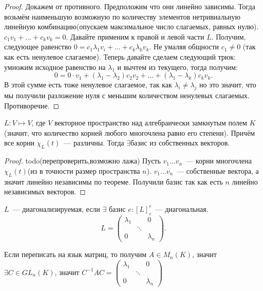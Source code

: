 \begin{proof}
    Докажем от противного. Предположим что они линейно зависимы. Тогда возьмём наименьшую возможную по количеству элементов
    нетривиальную линейную комбинацию(опускаем максимальное число слагаемых, равных нулю).
    $c_1v_1+\dots+c_kv_k = 0$. Давайте применим к правой и левой части $L$. Получим, следующее равенство
    $0 = c_1\lambda_1v_i+\dots + c_k\lambda_kv_k$. Не умаляя общности $c_1\not=0$ (так как есть ненулевое слагаемое).
    Теперь давайте сделаем следующий трюк: умножим исходное равенство на $\lambda_1$ и вычтем из текущего, тогда получим:
    \[
    0 = 0\cdot v_1 + (\lambda_1 - \lambda_2)c_2v_2 + \dots + (\lambda_1 - \lambda_k) c_k v_k
    .\]
    В этой сумме есть тоже ненулевое слагаемое, так как $\lambda_i \not= \lambda_j$ но это значит, что мы получили
    разложение нуля с меньшим количеством ненулевых слагаемых. Противоречие.
\end{proof}
\begin{follow}
    $L\colon V \mapsto V$, где $V$ векторное пространство над алгебраически замкнутым полем $K$(значит, что количество корней
    любого многочлена равно его степени). Причём все корни $\chi_L(t)$~--- различны.
    Тогда $\exists \text{базис из собственных векторов}$.
\end{follow}
\begin{proof}
    todo(перепроверить,возможно лажа)
    Пусть $v_1\dots v_n$~--- корни многочлена $\chi_L(t)$(из в точности размер пространства $n$).
    $v_1\dots v_n$~--- собственные вектора, а значит линейно независимы по теореме. Получили базис так как есть
    $n$ линейно независимых векторов.
\end{proof}
\begin{definition}
    $L$~--- диагонализируемая, если $\exists$ базис $e\colon [L]^e_e$~--- диагональная.
    \[
        L = 
        \begin{pmatrix}
            \lambda_1&&0\\
            &\ddots &\\
            0& & \lambda_n
        \end{pmatrix}
    .\] 

    Если переписать на язык матриц, то получим $A\in M_n(K)$, значит $\exists C\in GL_n(K)$, значит $C^{-1}AC = 
    \begin{pmatrix}
        \lambda_1&&0\\
        &\ddots &\\
        0& & \lambda_n
    \end{pmatrix} $
\end{definition}
